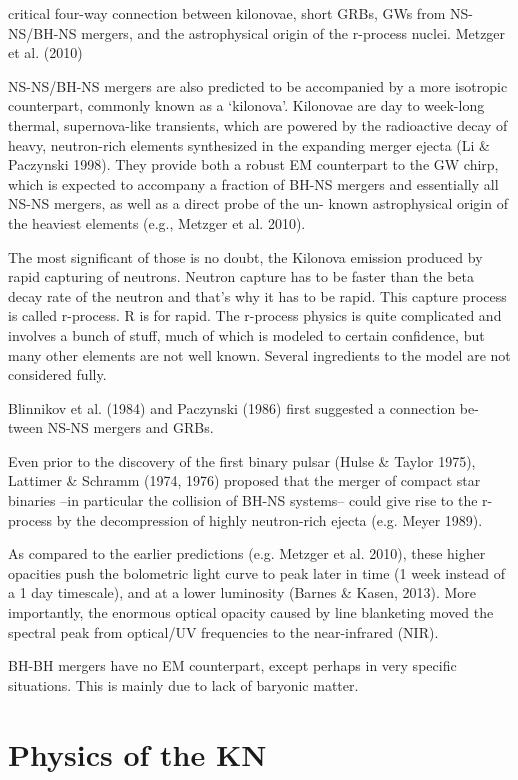 critical four-way connection between kilonovae, short GRBs, GWs from NS-NS/BH-NS mergers, and the astrophysical origin of the r-process nuclei. Metzger et al. (2010)

NS-NS/BH-NS mergers are also predicted to be accompanied by a more isotropic counterpart, commonly known as a `kilonova'. Kilonovae are day to week-long thermal, supernova-like transients, which are powered by the radioactive decay of heavy, neutron-rich elements synthesized in the expanding merger ejecta (Li \& Paczynski 1998). They provide both a robust EM counterpart to the GW chirp, which is expected to accompany a fraction of BH-NS mergers and essentially all NS-NS mergers, as well as a direct probe of the un- known astrophysical origin of the heaviest elements (e.g., Metzger et al. 2010).

The most significant of those is no doubt, the Kilonova emission produced by rapid capturing of neutrons.
Neutron capture has to be faster than the beta decay rate of the neutron and that's why it has to be rapid.
This capture process is called r-process. R is for rapid.
The r-process physics is quite complicated and involves a bunch of stuff, much of which is modeled to certain confidence, but many other elements are not well known. Several ingredients to the model are not considered fully. 

Blinnikov et al. (1984) and Paczynski (1986) first suggested a connection be- tween NS-NS mergers and GRBs.

Even prior to the discovery of the first binary pulsar (Hulse \& Taylor 1975), Lattimer \& Schramm (1974, 1976) proposed that the merger of compact star binaries --in particular the collision of BH-NS systems-- could give rise to the r-process by the decompression of highly neutron-rich ejecta (e.g. Meyer 1989). 

As compared to the earlier predictions (e.g. Metzger et al. 2010), these higher opacities push the bolometric light curve to peak later in time (1 week instead of a 1 day timescale), and at a lower luminosity (Barnes \& Kasen, 2013). More importantly, the enormous optical opacity caused by line blanketing moved the spectral peak from optical/UV frequencies to the near-infrared (NIR).

BH-BH mergers have no EM counterpart, except perhaps in very specific situations. This is mainly due to lack of baryonic matter.

\section{Physics of the KN}


